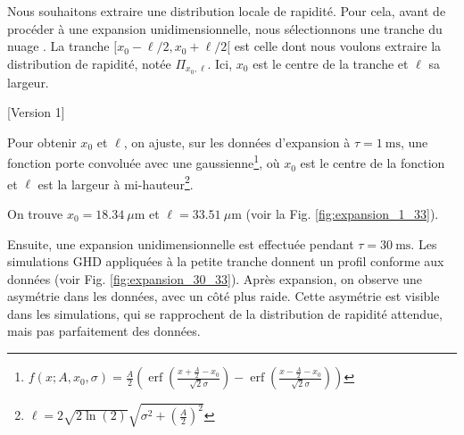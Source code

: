 \documentclass[a3, 10pt,twoside]{article}          %
\theoremstyle{plain}
\theoremstyle{definition}
\theoremstyle{remark}
\theoremstyle{definition} %
\begin{document}
Nous souhaitons extraire une distribution locale de rapidité. Pour cela, avant de procéder à une expansion unidimensionnelle, nous sélectionnons une tranche du nuage \cite{dubois_probing_2024}. La tranche $[x_0 - \ell/2, x_0 + \ell/2[$ est celle dont nous voulons extraire la distribution de rapidité, notée $\Pi_{x_0, \ell}$. Ici, $x_0$ est le centre de la tranche et $\ell$ sa largeur.

	
		
	[Version 1] 
	
Pour obtenir $x_0$ et $\ell$, on ajuste, sur les données d'expansion à $\tau = 1~\text{ms}$, une fonction porte convoluée avec une gaussienne\footnote{$f(x; A, x_0, \sigma) = \frac{A}{2} \left( \operatorname{erf} \left( \frac{x + \frac{A}{2} - x_0}{\sqrt{2} \sigma} \right) - \operatorname{erf} \left( \frac{x - \frac{A}{2} - x_0}{\sqrt{2} \sigma} \right) \right)$}, où $x_0$ est le centre de la fonction et $\ell$ est la largeur à mi-hauteur\footnote{$\ell = 2\sqrt{2 \ln (2)} \sqrt{\sigma^2 + \left( \frac{A}{2} \right)^2}$}. 

On trouve $x_0 = 18.34~\mu \text{m}$ et $\ell = 33.51~\mu \text{m}$ (voir la Fig. \ref{fig:expansion_1_33}).

Ensuite, une expansion unidimensionnelle est effectuée pendant $\tau = 30~\text{ms}$. Les simulations GHD appliquées à la petite tranche donnent un profil conforme aux données (voir Fig. \ref{fig:expansion_30_33}). Après expansion, on observe une asymétrie dans les données, avec un côté plus raide. Cette asymétrie est visible dans les simulations, qui se rapprochent de la distribution de rapidité attendue, mais pas parfaitement des données.
\end{document}
